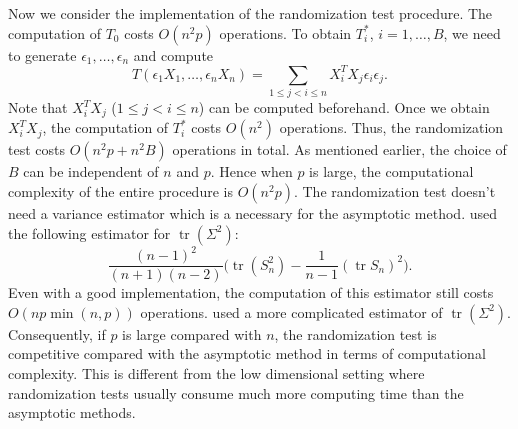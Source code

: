 \documentclass[3p]{elsarticle}
\DeclareMathOperator{\mytr}{tr}
\theoremstyle{plain}
\theoremstyle{definition}
\theoremstyle{remark}
\begin{document}
Now we consider the implementation of the randomization test procedure.
The computation of $T_0$ costs $O(n^2 p)$ operations.
To obtain $T_i^*$, $i=1,\ldots,B$, we need to generate $\epsilon_1,\ldots,\epsilon_n$ and compute
\begin{equation*}
T(\epsilon_1 X_1,\ldots,\epsilon_n X_n)
=\sum_{1\leq j<i \leq n}X_i^T X_j \epsilon_i \epsilon_j.
\end{equation*}
Note that $X_i^T X_j$ ($1\leq j<i\leq n$) can be computed beforehand.
Once we obtain $X_i^T X_j$, the computation of $T_i^*$ costs $O(n^2)$ operations.
Thus, the randomization test costs $O(n^2 p+n^2 B)$ operations in total.
As mentioned earlier, the choice of $B$ can be independent of $n$ and $p$.
Hence when $p$ is large, the computational complexity of the entire procedure is $O(n^2 p)$.
The randomization test doesn't need a variance estimator which is a necessary for the asymptotic method. 
\cite{Bai1996Efiect} used the following estimator for $\mytr(\Sigma^2)$:
$$
\frac{(n-1)^2}{(n+1)(n-2)}\big(\mytr(S_n^2)-\frac{1}{n-1}(\mytr S_n)^2\big).
$$
Even with a good implementation, the computation of this estimator still costs $O(np\min(n,p))$ operations.
\citet{Chen2010A} used a more complicated estimator of $\mytr(\Sigma^2)$.
Consequently, if $p$ is large compared with $n$, the randomization test is competitive compared with the asymptotic method in terms of computational complexity.
This is different from the low dimensional setting where randomization tests usually consume much more computing time than the asymptotic methods.
\end{document}
